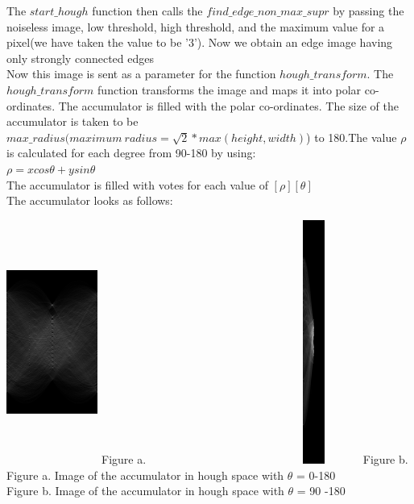 \documentclass{article}
\begin{document}
\begin{enumerate}
		The $start\_hough$ function then calls the $find\_edge\_non\_max\_supr$ by passing the noiseless image, low threshold, high threshold, and the maximum value for a pixel(we have taken the value to be '3'). Now we obtain an edge image having only strongly connected edges \\
		Now this image is sent as a parameter for the function $hough\_transform$. The $hough\_transform$ function transforms the image and maps it into polar co-ordinates. The accumulator is filled with the polar co-ordinates. The size of the accumulator is taken to be $max\_radius(maximum~ radius = \sqrt{2} * max(height,width)$) to 180.The value $\rho$ is calculated for each degree from 90-180 by using: \\
		$\rho = xcos\theta + ysin\theta$ \\
		The accumulator is filled with votes for each value of $[\rho][\theta]$ \\
		The accumulator looks as follows: \\
		\begin{center}
			\includegraphics[height=8cm, width = 3cm]{detectacc.png} Figure a.~~~~~~~~~~~~~~~~~~~~~
			\includegraphics [height=8cm, width = 3cm]{detectacc1.png} Figure b.\\ 	
			Figure a. Image of the accumulator in hough space with $\theta$ = 0-180 \\ 
			Figure b. Image of the accumulator in hough space with $\theta$ = 90 -180\\ 
		\end{center}
		

\end{enumerate}
\end{document}
